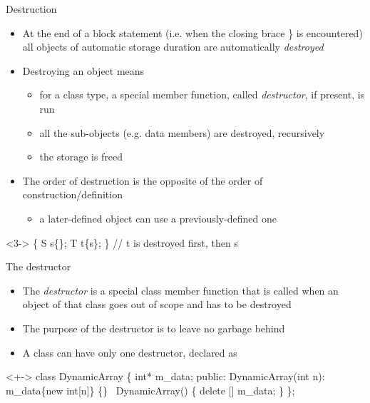 \begin{frame}[fragile]{Destruction}

  \begin{itemize}
  \item<1-> At the end of a block statement (i.e. when the closing brace
    \alert{\}} is encountered) all objects of automatic storage duration are
    automatically \textit{destroyed}
  \item<2-> Destroying an object means
    \begin{itemize}
    \item for a class type, a special member function, called
      \textit{destructor}, if present, is run
    \item all the sub-objects (e.g. data members) are destroyed, recursively
    \item the storage is freed
    \end{itemize}
  \item<3-> The order of destruction is the opposite of the order of
    construction/definition
    \begin{itemize}
    \item a later-defined object can use a previously-defined one
    \end{itemize}
  \end{itemize}

  \begin{codeblock}<3->{
\{
  S s\{\ddd\};
  \ddd
  T t\{s\};
  \ddd
\} // t is destroyed first, then s}\end{codeblock}

\end{frame}

\begin{frame}[fragile]{The destructor}

  \begin{itemize}[<+->]
  \item The \textit{destructor} is a special class member function that is
    called when an object of that class goes out of scope and has to be
    destroyed
  \item The purpose of the destructor is to leave no garbage behind
  \item A class can have only one destructor, declared as
  \end{itemize}

  \begin{codeblock}<+->{
class DynamicArray \{
  \ddd
  int* m_data;
 public:
  DynamicArray(int n): m_data\{new int[n]\} \{\ddd\}
  ~DynamicArray()
  \{
    delete [] m_data;
  \}
  \ddd
\};
}\end{codeblock}

\end{frame}

